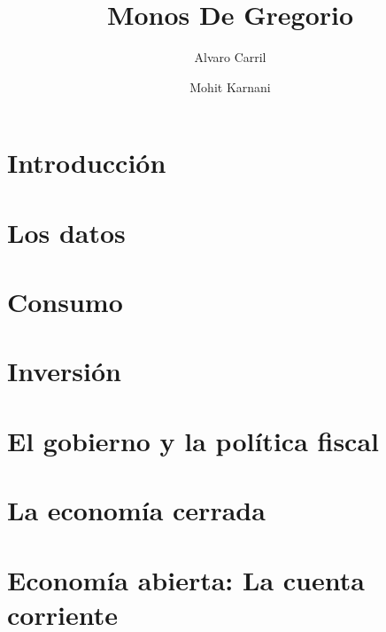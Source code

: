 \documentclass{article}
\title{Monos De Gregorio}
\author{Alvaro Carril \and Mohit Karnani}
\numberwithin{figure}{section}
\begin{document}
\maketitle \newpage

\section{Introducción}

\section{Los datos}

\section{Consumo}
    
    
    
    

\section{Inversión}
    
    
    
    
    

\section{El gobierno y la política fiscal} %

\section{La economía cerrada} %
    
    
    
    
    
    
    

\section{Economía abierta: La cuenta corriente}
    
    
    
    
    
    
    
    
    
    
\end{document}
